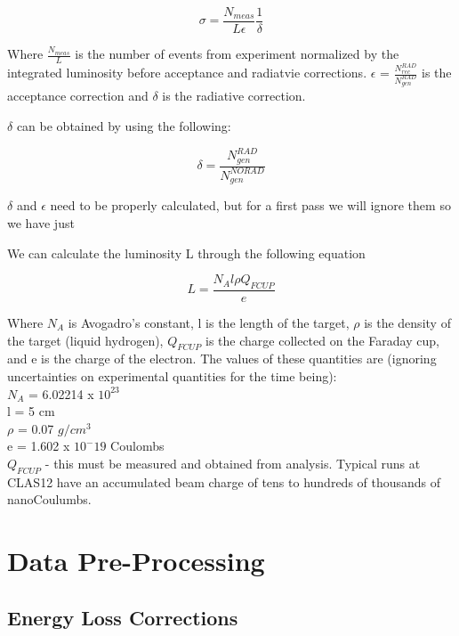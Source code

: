 \begin{equation}
    \sigma = \frac{N_{meas}}{L \epsilon}\frac{1}{\delta}
\end{equation}

Where $\frac{N_{meas}}{L}$ is the number of events from experiment normalized by the integrated luminosity before acceptance and radiatvie corrections. $\epsilon$ = $\frac{N^{RAD}_{rec}}{{N^{RAD}_{gen}}}$ is the acceptance correction and $\delta$ is the radiative correction.



$\delta$ can be obtained by using the following:

\begin{equation}
    \delta = \frac{N^{RAD}_{gen}}{N^{NORAD}_{gen}}
\end{equation}

$\delta$ and $\epsilon$ need to be properly calculated, but for a first pass we will ignore them so we have just



We can calculate the luminosity L through the following equation

\begin{equation}
    L = \frac{N_A l \rho Q_{FCUP}}{e}
\end{equation}

Where $N_A$ is Avogadro's constant, l is the length of the target,  $\rho$ is the density of the target (liquid hydrogen), $Q_{FCUP}$ is the charge collected on the Faraday cup, and e is the charge of the electron. The values of these quantities are (ignoring uncertainties on experimental quantities for the time being):\\

$N_A$ = 6.02214 x $10^{23}$\\
l = 5 cm\\
$\rho$ = 0.07 $g/cm^3$\\
e = 1.602 x $10^-19$ Coulombs\\
$Q_{FCUP}$ - this must be measured and obtained from analysis. Typical runs at CLAS12 have an accumulated beam charge of tens to hundreds of thousands of nanoCoulumbs. 

\section{Data Pre-Processing}
    \subsection{Energy Loss Corrections}
